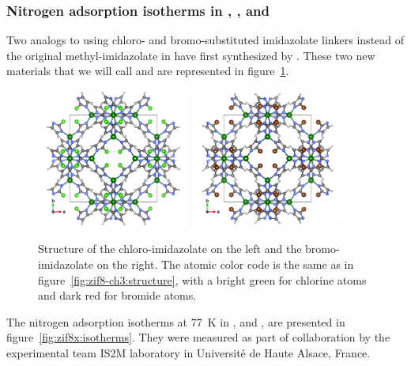 \documentclass[thesis]{subfiles}
\begin{document}
\subsubsection{Nitrogen adsorption isotherms in , \ZIFCl, and \ZIFBr}

Two analogs to  using chloro- and bromo-substituted imidazolate linkers
instead of the original methyl-imidazolate in  have first synthesized by
\citeauthor{Li2009}\cite{Li2009}. These two new materials that we will call
\ZIFCl and \ZIFBr are represented in figure~\ref{fig:zif8x:structures}.

\begin{figure}[ht]
    \centering
    \includegraphics[width=0.45\textwidth]{figures/images/ZIF8-Cl}
    \hfill
    \includegraphics[width=0.45\textwidth]{figures/images/ZIF8-Br}
    \caption{Structure of the chloro-imidazolate \ZIFCl on the left and the
    bromo-imidazolate \ZIFBr on the right. The atomic color code is the same
    as in figure~\ref{fig:zif8-ch3:structure}, with a bright green for chlorine
    atoms and dark red for bromide atoms.}
    \label{fig:zif8x:structures}
\end{figure}

The nitrogen adsorption isotherms at \SI{77}{K} in , \ZIFCl and \ZIFBr, are
presented in figure~\ref{fig:zif8x:isotherms}. They were measured as part of
collaboration by the experimental team IS2M laboratory in Université de
Haute Alsace, France.
\end{document}
